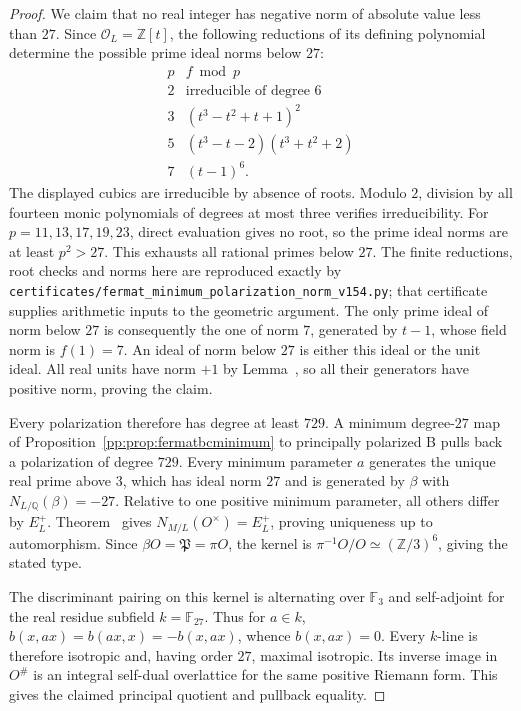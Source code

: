 \begin{proof}
We claim that no real integer has negative norm of absolute value
less than $27$. Since $\mathcal O_L=\mathbb Z[t]$, the following
reductions of its defining polynomial determine the possible prime
ideal norms below $27$:
\[
\begin{array}{c|l}
p&f\bmod p\\ \hline
2&\text{irreducible of degree }6\\
3&(t^3-t^2+t+1)^2\\
5&(t^3-t-2)(t^3+t^2+2)\\
7&(t-1)^6.
\end{array}
\]
The displayed cubics are irreducible by absence of roots. Modulo
$2$, division by all fourteen monic polynomials of degrees at most
three verifies irreducibility. For $p=11,13,17,19,23$, direct
evaluation gives no root, so the prime ideal norms are at least
$p^2>27$. This exhausts all rational primes below $27$. The finite reductions,
root checks and norms here are reproduced exactly by
\texttt{certificates/fermat\_minimum\_polarization\_norm\_v154.py};
that certificate supplies arithmetic inputs to the geometric argument.
The only prime ideal of norm below $27$ is consequently the one
of norm $7$, generated by $t-1$, whose field norm is $f(1)=7$.
An ideal of norm below $27$ is either this ideal or the unit ideal.
All real units have norm $+1$ by Lemma~, so
all their generators have positive norm, proving the claim.

Every polarization therefore has degree at least $729$. A minimum
degree-$27$ map of Proposition~\ref{pp:prop:fermatbcminimum} to
principally polarized B pulls back a polarization of degree $729$.
Every minimum parameter $a$ generates the unique real prime above
$3$, which has ideal norm $27$ and is generated by $\beta$ with
$N_{L/\mathbb Q}(\beta)=-27$. Relative to one
positive minimum parameter, all others differ by $E_L^+$.
Theorem~ gives
$N_{M/L}(O^\times)=E_L^+$, proving uniqueness up to automorphism.
Since $\beta O=\mathfrak P=\pi O$, the kernel is
$\pi^{-1}O/O\simeq(\mathbb Z/3)^6$, giving the stated type.

The discriminant pairing on this kernel is alternating over
$\mathbb F_3$ and self-adjoint for the real residue subfield
$k=\mathbb F_{27}$. Thus for $a\in k$,
$b(x,ax)=b(ax,x)=-b(x,ax)$, whence $b(x,ax)=0$.
Every $k$-line is therefore isotropic and, having order $27$,
maximal isotropic. Its inverse image in $O^\#$ is an integral
self-dual overlattice for the same positive Riemann form. This
gives the claimed principal quotient and pullback equality.


\end{proof}
